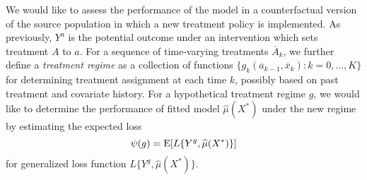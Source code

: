 We would like to assess the performance of the model in a counterfactual version of the source population in which a new treatment policy is implemented. As previously, $Y^a$ is the potential outcome under an intervention which sets treatment $A$ to $a$. For a sequence of time-varying treatments $\overline{A}_k$, we further define a \textit{treatment regime} as a collection of functions $\{g_k(\overline{a}_{k-1}, \overline{x}_k): k=0,\ldots, K\}$ for determining treatment assignment at each time $k$, possibly based on past treatment and covariate history. For a hypothetical treatment regime $g$, we would like to determine the performance of fitted model $\widehat{\mu}(X^*)$ under the new regime by estimating the expected loss 
$$\psi(g) = \operatorname{E}[L\{Y^g, \widehat{\mu}(X^*)\}]$$
for generalized loss function $L\{Y^g, \widehat{\mu}(X^*)\}$.

